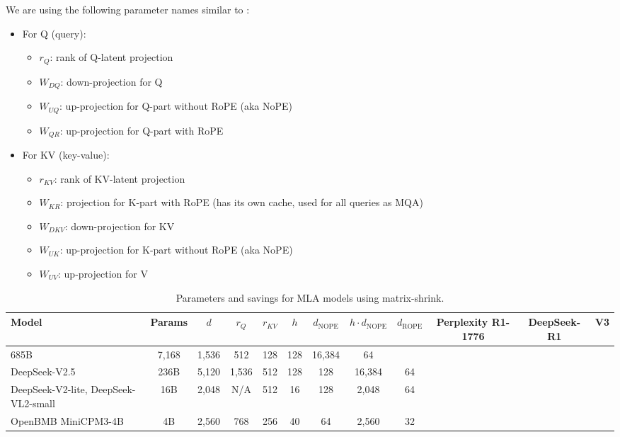 \documentclass{article}
\begin{document}
We are using the following parameter names similar to \cite{deepseek2024}:

\begin{itemize}
\item For Q (query):
  \begin{itemize}
    \item $r_Q$: rank of Q-latent projection
    \item $W_{DQ}$: down-projection for Q
    \item $W_{UQ}$: up-projection for Q-part without RoPE (aka NoPE)
    \item $W_{QR}$: up-projection for Q-part with RoPE
  \end{itemize}
\item For KV (key-value):
  \begin{itemize}
    \item $r_{KV}$: rank of KV-latent projection
    \item $W_{KR}$: projection for K-part with RoPE (has its own cache, used for all queries as MQA)
    \item $W_{DKV}$: down-projection for KV
    \item $W_{UK}$: up-projection for K-part without RoPE (aka NoPE)
    \item $W_{UV}$: up-projection for V
  \end{itemize}
\end{itemize}

\begin{table}[h]
\centering
\begin{tabular}{lccccccccccc}
\toprule
Model & Params & $d$ & $r_Q$ & $r_{KV}$ & $h$ & $d_{\text{NOPE}}$ & $h \cdot d_{\text{NOPE}}$ & $d_{\text{ROPE}}$ & Perplexity R1-1776 & DeepSeek-R1 & V3 \\
\midrule
685B & 7,168 & 1,536 & 512 & 128 & 128 & 16,384 & 64 & & & & \\
DeepSeek-V2.5 & 236B & 5,120 & 1,536 & 512 & 128 & 128 & 16,384 & 64 & & & \\
DeepSeek-V2-lite, DeepSeek-VL2-small & 16B & 2,048 & N/A & 512 & 16 & 128 & 2,048 & 64 & & & \\
OpenBMB MiniCPM3-4B & 4B & 2,560 & 768 & 256 & 40 & 64 & 2,560 & 32 & & & \\
\bottomrule
\end{tabular}
\caption{Parameters and savings for MLA models using matrix-shrink.}
\label{tab:tab2}
\end{table}
\end{document}
